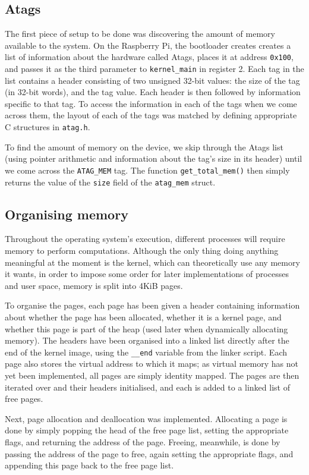 \documentclass[10pt,a4paper]{article}
\newcommand{\code}[1]{\texttt{#1}}
\begin{document}
\subsection*{Atags}
The first piece of setup to be done was discovering the amount of memory
available to the system. On the Raspberry Pi, the bootloader creates creates a
list of information about the hardware called Atags, places it at address
\code{0x100}, and passes it as the third parameter to \code{kernel\_main} in
register 2. Each tag in the list contains a header consisting of two unsigned
32-bit values: the size of the tag (in 32-bit words), and the tag value. Each
header is then followed by information specific to that tag. To access the
information in each of the tags when we come across them, the layout of each of
the tags \cite{atags} was matched by defining appropriate C structures in
\code{atag.h}.

To find the amount of memory on the device, we skip through the Atags list
(using pointer arithmetic and information about the tag's size in its header)
until we come across the \code{ATAG\_MEM} tag. The function
\code{get\_total\_mem()} then simply returns the value of the \code{size} field
of the \code{atag\_mem} struct.

\subsection*{Organising memory}
Throughout the operating system's execution, different processes will require
memory to perform computations. Although the only thing doing anything
meaningful at the moment is the kernel, which can theoretically use any memory
it wants, in order to impose some order for later implementations of processes
and user space, memory is split into 4KiB pages.

To organise the pages, each page has been given a header containing information
about whether the page has been allocated, whether it is a kernel page, and
whether this page is part of the heap (used later when dynamically allocating
memory). The headers have been organised into a linked list directly after
the end of the kernel image, using the \code{\_\_end} variable from the linker
script. Each page also stores the virtual address to which it maps; as virtual
memory has not yet been implemented, all pages are simply identity mapped. The
pages are then iterated over and their headers initialised, and each is added to
a linked list of free pages.

Next, page allocation and deallocation was implemented. Allocating a page is
done by simply popping the head of the free page list, setting the appropriate
flags, and returning the address of the page. Freeing, meanwhile, is done by
passing the address of the page to free, again setting the appropriate flags,
and appending this page back to the free page list.
\end{document}
